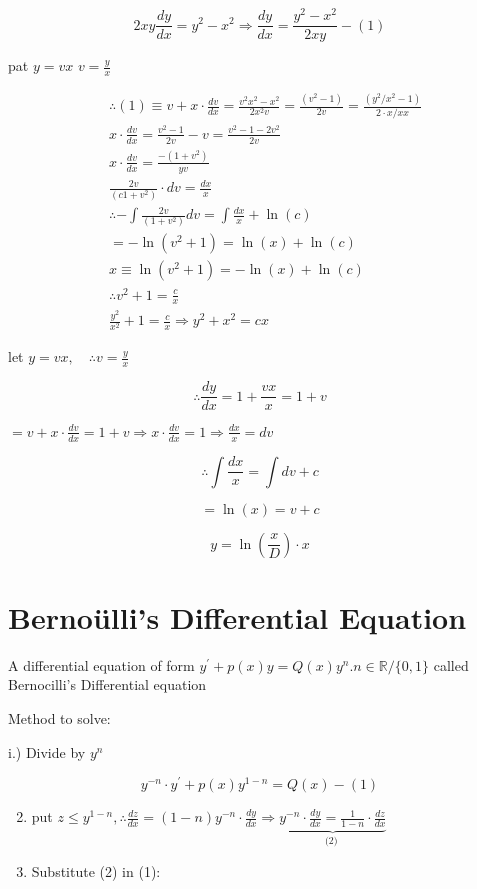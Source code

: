 \documentclass[12pt, a4paper]{article}
\begin{document}
$$
2 x y \frac{d y}{d x}=y^{2}-x^{2} \Rightarrow \frac{d y}{d x}=\frac{y^{2}-x^{2}}{2 x y}-(1)
$$

pat $y=v x$ $v=\frac{y}{x}$

$$
\begin{aligned}
& \therefore(1) \equiv v+x \cdot \frac{d v}{d x}=\frac{v^{2} x^{2}-x^{2}}{2 x^{2} v}=\frac{\left(v^{2}-1\right)}{2 v}=\frac{\left(y^{2} / x^{2}-1\right)}{2 \cdot x / x x} \\
& x \cdot \frac{d v}{d x}=\frac{v^{2}-1}{2 v}-v=\frac{v^{2}-1-2 v^{2}}{2 v} \\
& x \cdot \frac{d v}{d x}=\frac{-\left(1+v^{2}\right)}{y v} \\
& \frac{2 v}{\left(c 1+v^{2}\right)} \cdot d v=\frac{d x}{x} \\
& \therefore-\int \frac{2 v}{\left(1+v^{2}\right)} d v=\int \frac{d x}{x}+\ln (c) \\
&=-\ln \left(v^{2}+1\right)=\ln (x)+\ln (c) \\
& x \equiv \ln \left(v^{2}+1\right)=-\ln (x)+\ln (c) \\
& \therefore v^{2}+1=\frac{c}{x} \\
& \frac{y^{2}}{x^{2}}+1=\frac{c}{x} \Rightarrow y^{2}+x^{2}=c x
\end{aligned}
$$

let $y=v x, \quad \therefore v=\frac{y}{x}$

$$
\therefore \frac{d y}{d x}=1+\frac{v x}{x}=1+v
$$

$=v+x \cdot \frac{d v}{d x}=1+v \Rightarrow x \cdot \frac{d v}{d x}=1 \Rightarrow \frac{d x}{x}=d v$

$$
\therefore \int \frac{d x}{x}=\int d v+c
$$

$$
=\ln (x)=v+c
$$

$$
y=\ln \left(\frac{x}{D}\right) \cdot x
$$

\section*{Bernoülli's Differential Equation}
A differential equation of form $y^{\prime}+p(x) y=Q(x) y^{n} . n \in \mathbb{R} /\{0,1\}$ called Bernocilli's Differential equation

Method to solve:

i.) Divide by $y^{n}$

$$
y^{-n} \cdot y^{\prime}+p(x) y^{1-n}=Q(x)-(1)
$$

\begin{enumerate}
  \setcounter{enumi}{1}
  \item put $z \leq y^{1-n}, \therefore \frac{d z}{d x}=(1-n) y^{-n} \cdot \frac{d y}{d x} \Rightarrow \underbrace{y^{-n} \cdot \frac{d y}{d x}=\frac{1}{1-n} \cdot \frac{d z}{d x}}_{\text {(2) }}$

  \item Substitute (2) in (1):

\end{enumerate}
\end{document}
